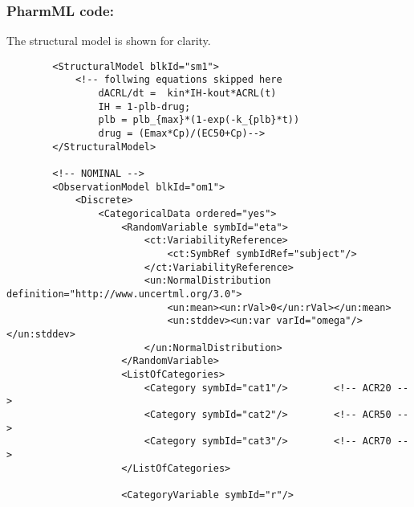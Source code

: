 \subsubsection{PharmML code:}
The structural model is shown for clarity.

\lstset{language=XML}
\begin{lstlisting}
        <StructuralModel blkId="sm1">
            <!-- follwing equations skipped here        
                dACRL/dt =  kin*IH-kout*ACRL(t)
                IH = 1-plb-drug;
                plb = plb_{max}*(1-exp(-k_{plb}*t))
                drug = (Emax*Cp)/(EC50+Cp)-->
        </StructuralModel>
        
        <!-- NOMINAL -->
        <ObservationModel blkId="om1">
            <Discrete>
                <CategoricalData ordered="yes">
                    <RandomVariable symbId="eta">
                        <ct:VariabilityReference>
                            <ct:SymbRef symbIdRef="subject"/>
                        </ct:VariabilityReference>
                        <un:NormalDistribution definition="http://www.uncertml.org/3.0">
                            <un:mean><un:rVal>0</un:rVal></un:mean>
                            <un:stddev><un:var varId="omega"/></un:stddev>
                        </un:NormalDistribution>
                    </RandomVariable>
                    <ListOfCategories> 
                        <Category symbId="cat1"/>        <!-- ACR20 -->
                        <Category symbId="cat2"/>        <!-- ACR50 -->
                        <Category symbId="cat3"/>        <!-- ACR70 -->
                    </ListOfCategories>
                    
                    <CategoryVariable symbId="r"/>
                    

\end{lstlisting}
